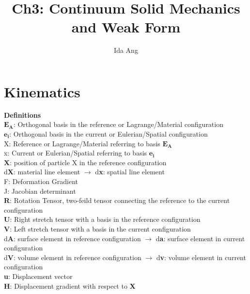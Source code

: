\documentclass[12pt,3p]{article}
\numberwithin{equation}{section}
\begin{document}
\title{Ch3: Continuum Solid Mechanics and Weak Form}
\author{Ida Ang}
\date{\vspace{-5ex}}
\maketitle

\tableofcontents
\newpage

\section{Kinematics}
\textbf{Definitions} \\
$\mathbf{E_A}$: Orthogonal basis in the reference or Lagrange/Material configuration \\
$\mathbf{e_i}$: Orthogonal basis in the current or Eulerian/Spatial configuration \\
X: Reference or Lagrange/Material referring to basis $\mathbf{E_A}$ \\
x: Current or Eulerian/Spatial referring to basis $\mathbf{e_i}$\\
$\mathbf{X}$: position of particle X in the reference configuration \\
d\textbf{X}: material line element $\rightarrow$ d\textbf{x}: spatial line element  \\
F: Deformation Gradient \\
J: Jacobian determinant \\
\textbf{R}: Rotation Tensor, two-feild tensor connecting the reference to the current configuration\\
\textbf{U}: Right stretch tensor with a basis in the reference configuration \\
\textbf{V}: Left stretch tensor with a basis in the current configuration \\
d\textbf{A}: surface element in reference configuration $\rightarrow$ d\textbf{a}: surface element in current configuration \\
d\textbf{V}: volume element in reference configuration $\rightarrow$ d\textbf{v}: volume element in current configuration \\
\textbf{u}: Displacement vector \\
\textbf{H}: Displacement gradient with respect to \textbf{X}
\end{document}
